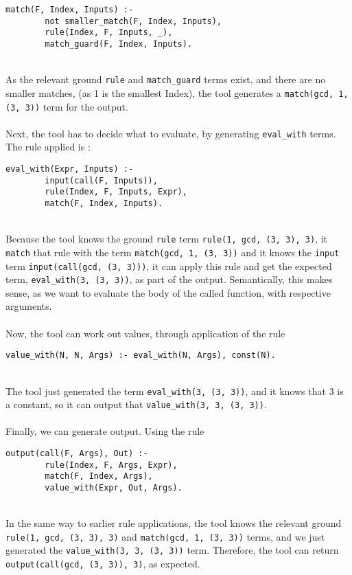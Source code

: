 \begin{lstlisting}[firstnumber=197]
match(F, Index, Inputs) :- 
		not smaller_match(F, Index, Inputs), 
		rule(Index, F, Inputs, _), 
		match_guard(F, Index, Inputs).
\end{lstlisting}
\mbox{} \\
As the relevant ground \lstinline{rule} and \lstinline{match_guard} terms exist, and there are no smaller matches, (as 1 is the smallest Index), the tool generates a \lstinline{match(gcd, 1, (3, 3))} term for the output. \\ \\ %
Next, the tool has to decide what to evaluate, by generating \lstinline{eval_with} terms. The rule applied is :\\ %

\begin{lstlisting}[firstnumber=128]
eval_with(Expr, Inputs) :- 
		input(call(F, Inputs)), 
		rule(Index, F, Inputs, Expr), 
		match(F, Index, Inputs).
\end{lstlisting}
\mbox{} \\
Because the tool knows the ground \lstinline{rule} term \lstinline{rule(1, gcd, (3, 3), 3)}, it \lstinline{match} that rule with the term \lstinline{match(gcd, 1, (3, 3))} and it knows the \lstinline{input} term \lstinline{input(call(gcd, (3, 3)))}, it can apply this rule and get the expected term, \lstinline{eval_with(3, (3, 3))}, as part of the output. Semantically, this makes sense, as we want to evaluate the body of the called function, with respective arguments. \\ \\%
Now, the tool can work out values, through application of the rule \\

\begin{lstlisting}[firstnumber=97]
value_with(N, N, Args) :- eval_with(N, Args), const(N).
\end{lstlisting}
\mbox{} \\
The tool just generated the term \lstinline{eval_with(3, (3, 3))}, and it knows that 3 is a constant, so it can output that \lstinline{value_with(3, 3, (3, 3))}. \\ \\
Finally, we can generate output. Using the rule \\

\begin{lstlisting}[firstnumber=55]
output(call(F, Args), Out) :- 
		rule(Index, F, Args, Expr), 
		match(F, Index, Args), 
		value_with(Expr, Out, Args).
\end{lstlisting}
\mbox{} \\
In the same way to earlier rule applications, the tool knows the relevant ground \lstinline{rule(1, gcd, (3, 3), 3)} and \lstinline{match(gcd, 1, (3, 3))} terms, and we just generated the \lstinline{value_with(3, 3, (3, 3))} term. Therefore, the tool can return \lstinline{output(call(gcd, (3, 3)), 3)}, as expected.


